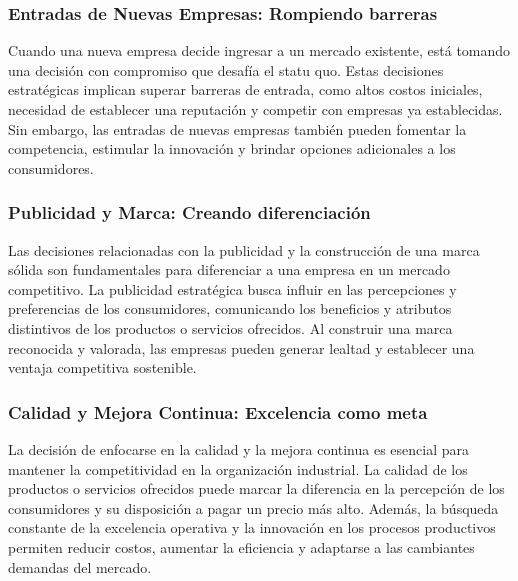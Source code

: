 \documentclass[
  a4paper,
]{article}
\begin{document}
\hypertarget{entradas-de-nuevas-empresas-rompiendo-barreras}{%
\subsubsection{Entradas de Nuevas Empresas: Rompiendo
barreras}\label{entradas-de-nuevas-empresas-rompiendo-barreras}}

Cuando una nueva empresa decide ingresar a un mercado existente, está
tomando una decisión con compromiso que desafía el statu quo. Estas
decisiones estratégicas implican superar barreras de entrada, como altos
costos iniciales, necesidad de establecer una reputación y competir con
empresas ya establecidas. Sin embargo, las entradas de nuevas empresas
también pueden fomentar la competencia, estimular la innovación y
brindar opciones adicionales a los consumidores.

\hypertarget{publicidad-y-marca-creando-diferenciaciuxf3n}{%
\subsubsection{Publicidad y Marca: Creando
diferenciación}\label{publicidad-y-marca-creando-diferenciaciuxf3n}}

Las decisiones relacionadas con la publicidad y la construcción de una
marca sólida son fundamentales para diferenciar a una empresa en un
mercado competitivo. La publicidad estratégica busca influir en las
percepciones y preferencias de los consumidores, comunicando los
beneficios y atributos distintivos de los productos o servicios
ofrecidos. Al construir una marca reconocida y valorada, las empresas
pueden generar lealtad y establecer una ventaja competitiva sostenible.

\hypertarget{calidad-y-mejora-continua-excelencia-como-meta}{%
\subsubsection{Calidad y Mejora Continua: Excelencia como
meta}\label{calidad-y-mejora-continua-excelencia-como-meta}}

La decisión de enfocarse en la calidad y la mejora continua es esencial
para mantener la competitividad en la organización industrial. La
calidad de los productos o servicios ofrecidos puede marcar la
diferencia en la percepción de los consumidores y su disposición a pagar
un precio más alto. Además, la búsqueda constante de la excelencia
operativa y la innovación en los procesos productivos permiten reducir
costos, aumentar la eficiencia y adaptarse a las cambiantes demandas del
mercado.
\end{document}
